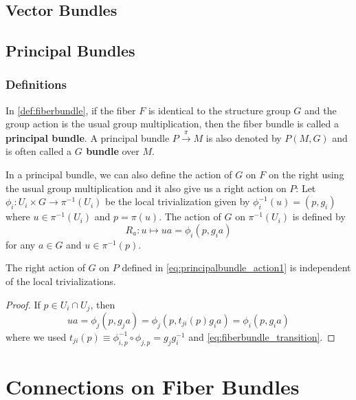 \documentclass[10pt]{article}
\begin{document}
\subsection{Vector Bundles}


\subsection{Principal Bundles}
\subsubsection{Definitions}
\begin{definition}
    In \cref{def:fiberbundle}, if the fiber $F$ is identical to the structure group $G$ and the group action is the usual group multiplication, then the fiber bundle is called a \textbf{principal bundle}.
    A principal bundle $P\xrightarrow{\pi}M$ is also denoted by $P(M,G)$ and is often called a \textbf{$G$ bundle} over $M$. 
\end{definition}

In a principal bundle, we can also define the action of $G$ on $F$ on the right using the usual group multiplication and it also give us a right action on $P$:
Let $\phi_i:U_i\times G\to \pi^{-1}(U_i)$ be the local trivialization given by $\phi_i^{-1}(u)=(p,g_i)$ where $u\in\pi^{-1}(U_i)$ and $p=\pi(u)$.
The action of $G$ on $\pi^{-1}(U_i)$ is defined by 
\begin{equation}\label{eq:principalbundle_action1}
    R_a:u\mapsto ua=\phi_i(p,g_i a)
\end{equation}
for any $a\in G$ and $u\in\pi^{-1}(p)$.
\begin{proposition}
    The right action of $G$ on $P$ defined in \cref{eq:principalbundle_action1} is independent of the local trivializations.
\end{proposition}
\begin{proof}
    If $p\in U_i\cap U_j$, then 
    \begin{equation}
        ua=\phi_j(p,g_j a)=\phi_{j}(p,t_{ji}(p)g_i a)=\phi_i(p,g_i a)
    \end{equation}
    where we used $t_{ji}(p)\equiv\phi_{i,p}^{-1}\circ\phi_{j,p}=g_j g_i^{-1}$ and \cref{eq:fiberbundle_transition}.
\end{proof}



\section{Connections on Fiber Bundles}
\end{document}
